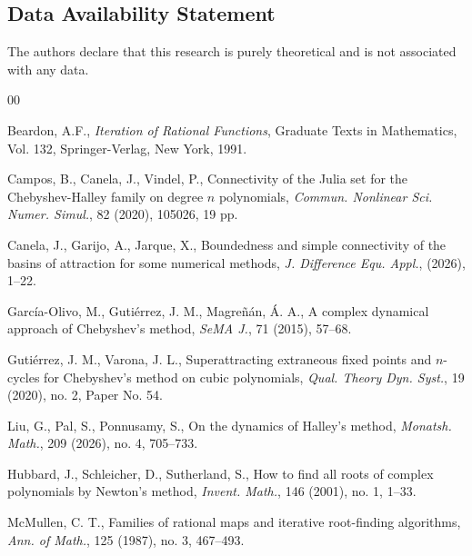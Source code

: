 \documentclass[12pt]{article}
\begin{document}
	\subsection*{Data Availability Statement}
	The authors declare that this research is purely theoretical and is not associated with any data.
	\FloatBarrier
	\begin{thebibliography}{00}
		
		Beardon, A.F., \textit{Iteration of Rational Functions}, Graduate Texts in Mathematics, Vol. 132, Springer-Verlag, New York, 1991.
		
		Campos, B., Canela, J., Vindel, P., Connectivity of the Julia set for the Chebyshev-Halley family on degree $n$ polynomials, \textit{Commun. Nonlinear Sci. Numer. Simul.}, 82 (2020), 105026, 19 pp.
		
		Canela, J., Garijo, A., Jarque, X., Boundedness and simple connectivity of the basins of attraction for some numerical methods, \textit{J. Difference Equ. Appl.}, (2026), 1--22.
		
	
	 
		Garc\'{i}a-Olivo, M., Guti\'{e}rrez, J. M., Magre\~{n}\'{a}n, \'{A}. A., A complex dynamical approach of Chebyshev's method, \textit{SeMA J.}, 71 (2015), 57--68.
		
		Guti\'{e}rrez, J. M., Varona, J. L., Superattracting extraneous fixed points and $n$-cycles for Chebyshev's method on cubic polynomials, \textit{Qual. Theory Dyn. Syst.}, 19 (2020), no. 2, Paper No. 54.
		
		Liu, G., Pal, S., Ponnusamy, S., On the dynamics of Halley's method, \textit{Monatsh. Math.}, 209 (2026), no. 4, 705–733.
		
		Hubbard, J., Schleicher, D., Sutherland, S., How to find all roots of complex polynomials by Newton's method, \textit{Invent. Math.}, 146 (2001), no. 1, 1--33.
		
		McMullen, C. T., Families of rational maps and iterative root-finding algorithms,
		\textit{Ann. of Math.}, 125 (1987), no. 3, 467--493.
		

\end{thebibliography}
\end{document}
